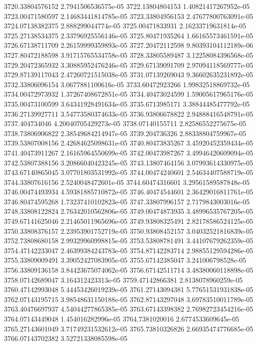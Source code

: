 {3720.33804576152 2.7941506536575e-05
3722.13804804153 1.40821417267952e-05
3723.00471580597 2.14683441814785e-05
3723.33804956153 2.47677800763091e-05
3724.07138382375 2.888299044774e-05
3725.00471833931 2.16233719631814e-05
3725.27138534375 2.33796925556146e-05
3725.80471935264 1.66165573461591e-05
3726.67138711709 2.26159999359893e-05
3727.20472112598 9.80393104112189e-06
3727.80472188598 3.91715765534758e-05
3728.33805589487 3.12258084396568e-05
3729.20472365932 3.30885952476246e-05
3729.67139091709 2.97094118569777e-05
3729.87139117043 2.47260721515038e-05
3731.07139269043 9.36602635231892e-05
3732.33806096154 3.0677881100616e-05
3733.60472923266 1.99832518869732e-05
3734.00472973932 1.37267408672851e-05
3734.40473024599 1.59005617965176e-05
3735.00473100599 3.64341928491634e-05
3735.6713985171 3.38844485477792e-05
3736.27139927711 3.54773580374633e-05
3736.93806678822 2.94888416548791e-05
3737.404734046 4.20040705429273e-05
3738.07140155711 2.82586552275675e-05
3738.73806906822 2.38549684214947e-05
3739.204736326 2.88338804759967e-05
3739.53807008156 2.42684625098631e-05
3740.80473835267 3.45920452359434e-05
3741.40473911267 2.16165964550699e-05
3742.00473987267 3.49946420609094e-05
3742.53807388156 3.20866040423245e-05
3743.13807464156 3.07993614330975e-05
3743.67140865045 3.07701803531992e-05
3744.00474240601 2.54634407588719e-05
3744.33807616156 2.5240048472601e-05
3744.60474316601 3.29561589587848e-05
3746.00474493934 4.59381885710872e-05
3746.40474544601 2.36429016811761e-05
3746.80474595268 1.73237410102823e-05
3747.33807996157 2.7179843003016e-05
3748.33808122824 2.76342010562806e-05
3749.00474873935 3.48996535767205e-05
3749.67141625046 2.21465011965696e-05
3749.93808325491 2.82178586524125e-05
3750.33808376157 2.23953901752719e-05
3750.93808452157 3.04032521816839e-05
3752.73808680158 2.99329960998815e-05
3753.53808781491 3.44107679262359e-05
3754.47142233047 2.46399384243783e-05
3754.87142283714 2.98855129594286e-05
3755.33809009491 3.39052427083905e-05
3755.67142385047 3.241006798528e-05
3756.33809136158 3.84423675074062e-05
3756.67142511714 3.48380060118898e-05
3758.07142689047 3.164312423313e-05
3759.47142866381 2.8138078960259e-05
3760.47142993048 5.44453426019239e-05
3761.27143094381 5.77651531931838e-05
3762.07143195715 3.98548631150188e-05
3762.87143297048 3.69783510011789e-05
3763.40476697937 4.54044277865385e-05
3763.67143398382 2.76982723454216e-05
3764.07143449048 1.454016282996e-05
3764.7381020016 2.6774533609645e-05
3765.27143601049 3.71749231532612e-05
3765.73810326826 2.66935474776685e-05
3766.07143702382 3.52721338085598e-05
}
